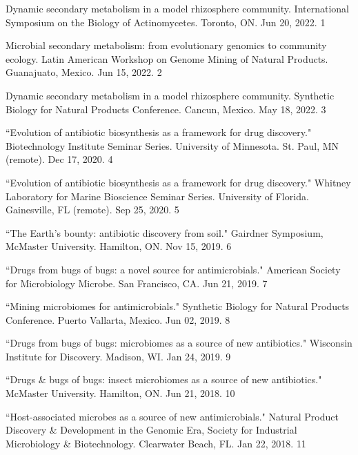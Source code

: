 \newpage


 \vspace{-2mm}

\begin{cvpubs}


\cvpub
{Dynamic secondary metabolism in a model rhizosphere community. International Symposium on the Biology of Actinomycetes. Toronto, ON. Jun 20, 2022.}
{1}

\cvpub
{Microbial secondary metabolism: from evolutionary genomics to
community ecology. Latin American Workshop on Genome Mining of Natural Products. Guanajuato, Mexico. Jun 15, 2022.}
{2}

\cvpub
{Dynamic secondary metabolism in a model rhizosphere community. Synthetic Biology for Natural Products Conference. Cancun, Mexico. May 18, 2022.}
{3}

\cvpub
{``Evolution of antibiotic biosynthesis as a framework for drug discovery." Biotechnology Institute Seminar Series. University of Minnesota. St. Paul, MN (remote). Dec 17, 2020.}
{4}

\cvpub
{``Evolution of antibiotic biosynthesis as a framework for drug discovery." Whitney Laboratory for Marine Bioscience Seminar Series. University of Florida. Gainesville, FL (remote). Sep 25, 2020.}
{5}

\cvpub
{``The Earth’s bounty: antibiotic discovery from soil." Gairdner Symposium, McMaster University. Hamilton, ON. Nov 15, 2019.}
{6}

\cvpub
{``Drugs from bugs of bugs: a novel source for antimicrobials." American Society for Microbiology Microbe. San Francisco, CA. Jun 21, 2019.}
{7}

\cvpub
{``Mining microbiomes for antimicrobials." Synthetic Biology for Natural Products Conference. Puerto Vallarta, Mexico. Jun 02, 2019.}
{8}

\cvpub
{``Drugs from bugs of bugs: microbiomes as a source of new antibiotics." Wisconsin Institute for Discovery. Madison, WI. Jan 24, 2019.}
{9}

\cvpub
{``Drugs \& bugs of bugs: insect microbiomes as a source of new antibiotics."  McMaster University. Hamilton, ON. Jun 21, 2018.}
{10}

\cvpub
{``Host-associated microbes as a source of new antimicrobials." Natural Product Discovery \& Development in the Genomic Era, Society for Industrial Microbiology \& Biotechnology. Clearwater Beach, FL. Jan 22, 2018.}
{11}


\end{cvpubs}
